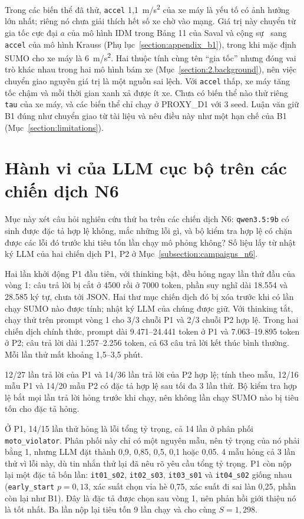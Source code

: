 \documentclass[../main.tex]{subfiles}
\begin{document}
Trong các biến thể đã thử, \texttt{accel} 1,1~m/s\textsuperscript{2} của xe máy là yếu tố có ảnh hưởng lớn nhất; riêng nó chưa giải thích hết số xe chờ vào mạng. Giá trị này chuyển từ gia tốc cực đại $a$ của mô hình IDM trong Bảng 11 của Saval và cộng sự~\cite{saval2023mixed} sang \texttt{accel} của mô hình Krauss (Phụ lục~\ref{section:appendix_b1}), trong khi mặc định SUMO cho xe máy là 6~m/s\textsuperscript{2}. Hai thuộc tính cùng tên ``gia tốc'' nhưng đóng vai trò khác nhau trong hai mô hình bám xe (Mục~\ref{section:2.background}), nên việc chuyển giao nguyên giá trị là một nguồn sai lệch. Với \texttt{accel} thấp, xe máy tăng tốc chậm và mỗi thời gian xanh xả được ít xe. Chưa có biến thể nào thử riêng \texttt{tau} của xe máy, và các biến thể chỉ chạy ở PROXY\_D1 với 3 seed. Luận văn giữ B1 đúng như chuyển giao từ tài liệu và nêu điều này như một hạn chế của B1 (Mục~\ref{section:limitations}).

\section{Hành vi của LLM cục bộ trên các chiến dịch N6}
\label{subsection:qwen_campaign_n6}

Mục này xét câu hỏi nghiên cứu thứ ba trên các chiến dịch N6: \texttt{qwen3.5:9b} có sinh được đặc tả hợp lệ không, mắc những lỗi gì, và bộ kiểm tra hợp lệ có chặn được các lỗi đó trước khi tiêu tốn lần chạy mô phỏng không? Số liệu lấy từ nhật ký LLM của hai chiến dịch P1, P2 ở Mục~\ref{subsection:campaigns_n6}.

Hai lần khởi động P1 đầu tiên, với thinking bật, đều hỏng ngay lần thử đầu của vòng 1: câu trả lời bị cắt ở 4500 rồi ở 7000 token, phần suy nghĩ dài 18.554 và 28.585 ký tự, chưa tới JSON. Hai thư mục chiến dịch đó bị xóa trước khi có lần chạy SUMO nào được tính; nhật ký LLM của chúng được giữ. Với thinking tắt, chạy thử trên prompt vòng 1 cho 3/3 chuỗi P1 và 2/3 chuỗi P2 hợp lệ. Trong hai chiến dịch chính thức, prompt dài 9.471--24.441 token ở P1 và 7.063--19.895 token ở P2; câu trả lời dài 1.257--2.256 token, cả 63 câu trả lời kết thúc bình thường. Mỗi lần thử mất khoảng 1,5--3,5 phút.

12/27 lần trả lời của P1 và 14/36 lần trả lời của P2 hợp lệ; tính theo mẫu, 12/16 mẫu P1 và 14/20 mẫu P2 có đặc tả hợp lệ sau tối đa 3 lần thử. Bộ kiểm tra hợp lệ bắt mọi lần trả lời hỏng trước khi chạy, nên không lần chạy SUMO nào bị tiêu tốn cho đặc tả hỏng.

Ở P1, 14/15 lần thử hỏng là lỗi tổng tỷ trọng, cả 14 lần ở phân phối \texttt{moto\_violator}. Phân phối này chỉ có một nguyên mẫu, nên tỷ trọng của nó phải bằng 1, nhưng LLM đặt thành 0,9, 0,85, 0,5, 0,1 hoặc 0,05. 4 mẫu hỏng cả 3 lần thử vì lỗi này, dù tin nhắn thử lại đã nêu rõ yêu cầu tổng tỷ trọng. P1 còn nộp lại một đặc tả bốn lần: \texttt{it01\_s02}, \texttt{it02\_s03}, \texttt{it03\_s01} và \texttt{it04\_s02} giống nhau (\texttt{early\_start} $p = 0{,}13$, xác suất chọn vỉa hè 0,75, xác suất đi sai làn 0,25, phần còn lại như B1). Đây là đặc tả được chọn sau vòng 1, nên phản hồi giới thiệu nó là tốt nhất. Ba lần nộp lại tiêu tốn 9 lần chạy và cho cùng $S = 1{,}298$.
\end{document}
